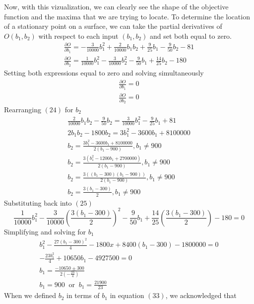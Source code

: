 \documentclass{article}
\begin{document}
Now, with this vizualization, we can clearly see the shape of the objective function and the maxima that we are
trying to locate. To determine the location of a stationary point on a surface, we can take the partial derivatives
of $O(b_1, b_2)$ with respect to each input $(b_1, b_2)$ and set both equal to zero.
\begin{gather}
    \frac{\partial O}{\partial b_1} = - \frac{3}{10000}b_1^2 + \frac{2}{10000}b_1b_2 + \frac{9}{25}b_1 - \frac{9}{50}b_2 - 81 \\
    \frac{\partial O}{\partial b_2} = \frac{1}{10000}b_1^2 - \frac{3}{10000}b_2^2 - \frac{9}{50}b_1 + \frac{14}{25}b_2 - 180
\end{gather}
Setting both expressions equal to zero and solving simultaneously
\begin{gather}
    \frac{\partial O}{\partial b_1} = 0 \\
    \frac{\partial O}{\partial b_2} = 0
\end{gather}
Rearranging $(24)$ for $b_2$
\begin{gather}
    \frac{2}{10000}b_1b_2 - \frac{9}{50}b_2 = \frac{3}{10000}b_1^2 - \frac{9}{25}b_1 + 81 \\
    2b_1b_2 - 1800b_2 = 3b_1^2 - 3600b_1 + 8100000 \\
    b_2 = \frac{3b_1^2 - 3600b_1 + 8100000}{2(b_1 - 900)}, b_1 \neq 900 \\
    b_2 = \frac{3(b_1^2 - 1200b_1 + 2700000)}{2(b_1 - 900)}, b_1 \neq 900 \\
    b_2 = \frac{3((b_1 - 300)(b_1 - 900))}{2(b_1 - 900)}, b_1 \neq 900 \\
    b_2 = \frac{3(b_1 - 300)}{2}, b_1 \neq 900
\end{gather}
Substituting back into $(25)$
\begin{dmath}
    \frac{1}{10000}b_1^2 - \frac{3}{10000}\left(\frac{3(b_1 - 300)}{2}\right)^2 - \frac{9}{50}b_1 + \frac{14}{25}\left(\frac{3(b_1 - 300)}{2}\right) - 180 = 0
\end{dmath}
Simplifying and solving for $b_1$
\begin{gather}
    b_1^2 - \frac{27(b_1-300)^2}{4} - 1800x + 8400(b_1-300) - 1800000 = 0 \\
    -\frac{23b_1^2}{4} + 10650b_1 - 4927500 = 0 \\
    b_1 = \frac{-10650\pm 300}{2(-\frac{23}{4})} \\
    b_1 = 900 \: \text{ or } \: b_1 = \frac{21900}{23}
\end{gather}
When we defined $b_2$ in terms of $b_1$ in equation $(33)$, we acknowledged that
\end{document}
